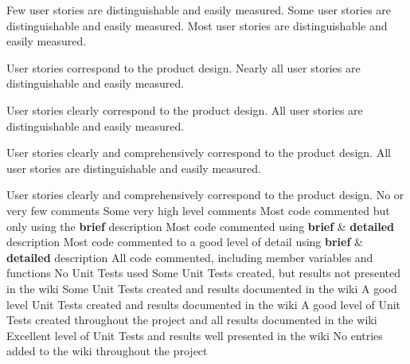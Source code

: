 \documentclass{../../fal_assignment}
\begin{document}
\rubricyeartwo
\begin{markingrubric}
%
%
	\grade \fail Few user stories are distinguishable and easily measured.
	\grade Some user stories are distinguishable and easily measured.
	\grade Most user stories are distinguishable and easily measured.
	\par User stories correspond to the product design.
	\grade Nearly all user stories are distinguishable and easily measured.
	\par User stories clearly correspond to the product design.
	\grade All user stories are distinguishable and easily measured.
	\par User stories clearly and comprehensively correspond to the product design.
	\grade All user stories are distinguishable and easily measured.
	\par User stories clearly and comprehensively correspond to the product design.
%
	\grade \fail No or very few comments
	\grade Some very high level comments
	\grade Most code commented but only using the \textbf{brief} description
	\grade Most code commented using \textbf{brief} \& \textbf{detailed} description
	\grade Most code commented to a good level of detail using \textbf{brief} \& \textbf{detailed} description
	\grade All code commented, including member variables and functions 
%
	\grade \fail No Unit Tests used
	\grade Some Unit Tests created, but results not presented in the wiki 
	\grade Some Unit Tests created and results documented in the wiki
	\grade A good level Unit Tests created and results documented in the wiki
	\grade A good level of Unit Tests created throughout the project and all results documented in the wiki
	\grade Excellent level of Unit Tests and results well presented in the wiki	
%
	\grade \fail No entries added to the wiki throughout the project

\end{markingrubric}
\end{document}
